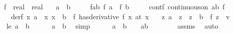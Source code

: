 \begin{isabellebody}
\ \ \ f\ {\isacharcolon}{\kern0pt}{\isacharcolon}{\kern0pt}\ {\isachardoublequoteopen}real\ {\isasymRightarrow}\ real{\isachardoublequoteclose}\isanewline
\ \ \ {\isachardoublequoteopen}a\ {\isacharless}{\kern0pt}\ b{\isachardoublequoteclose}\isanewline
\ \ \ \ \ fab{\isacharcolon}{\kern0pt}\ {\isachardoublequoteopen}f\ a\ {\isacharequal}{\kern0pt}\ f\ b{\isachardoublequoteclose}\isanewline
\ \ \ \ \ contf{\isacharcolon}{\kern0pt}\ {\isachardoublequoteopen}continuous{\isacharunderscore}{\kern0pt}on\ {\isacharbraceleft}{\kern0pt}a{\isachardot}{\kern0pt}{\isachardot}{\kern0pt}b{\isacharbraceright}{\kern0pt}\ f{\isachardoublequoteclose}\isanewline
\ \ \ \ \ derf{\isacharcolon}{\kern0pt}\ {\isachardoublequoteopen}{\isasymAnd}x{\isachardot}{\kern0pt}\ {\isasymlbrakk}a\ {\isacharless}{\kern0pt}\ x{\isacharsemicolon}{\kern0pt}\ x\ {\isacharless}{\kern0pt}\ b{\isasymrbrakk}\ {\isasymLongrightarrow}\ {\isacharparenleft}{\kern0pt}f\ has{\isacharunderscore}{\kern0pt}derivative\ f{\isacharprime}{\kern0pt}\ x{\isacharparenright}{\kern0pt}\ {\isacharparenleft}{\kern0pt}at\ x{\isacharparenright}{\kern0pt}{\isachardoublequoteclose}\isanewline
\ \ \ {\isachardoublequoteopen}{\isasymexists}z{\isachardot}{\kern0pt}\ a\ {\isacharless}{\kern0pt}\ z\ {\isasymand}\ z\ {\isacharless}{\kern0pt}\ b\ {\isasymand}\ f{\isacharprime}{\kern0pt}\ z\ {\isacharequal}{\kern0pt}\ {\isacharparenleft}{\kern0pt}{\isasymlambda}v{\isachardot}{\kern0pt}\ {}{\isacharparenright}{\kern0pt}{\isachardoublequoteclose}\isanewline
%
\isadelimproof
%
\endisadelimproof
%
\isatagproof
{}\isamarkupfalse%
\ {\isacharminus}{\kern0pt}\isanewline
\ \ \isamarkupfalse%
\ le{\isacharcolon}{\kern0pt}\ {\isachardoublequoteopen}a\ {\isasymle}\ b{\isachardoublequoteclose}\isanewline
\ \ \ \ \isamarkupfalse%
\ {\isacartoucheopen}a\ {\isacharless}{\kern0pt}\ b{\isacartoucheclose}\ \isamarkupfalse%
\ simp\isanewline
\ \ \ \ \isamarkupfalse%
\ {\isachardoublequoteopen}{\isacharparenleft}{\kern0pt}a\ {\isacharplus}{\kern0pt}\ b{\isacharparenright}{\kern0pt}\ {\isacharslash}{\kern0pt}\ {}\ {\isasymin}\ {\isacharbraceleft}{\kern0pt}a{\isachardot}{\kern0pt}{\isachardot}{\kern0pt}b{\isacharbraceright}{\kern0pt}{\isachardoublequoteclose}\isanewline
\ \ \ \ \ \ \isamarkupfalse%
\ assms{\isacharparenleft}{\kern0pt}{}{\isacharparenright}{\kern0pt}\ \isamarkupfalse%
\ auto\isanewline

\end{isabellebody}

